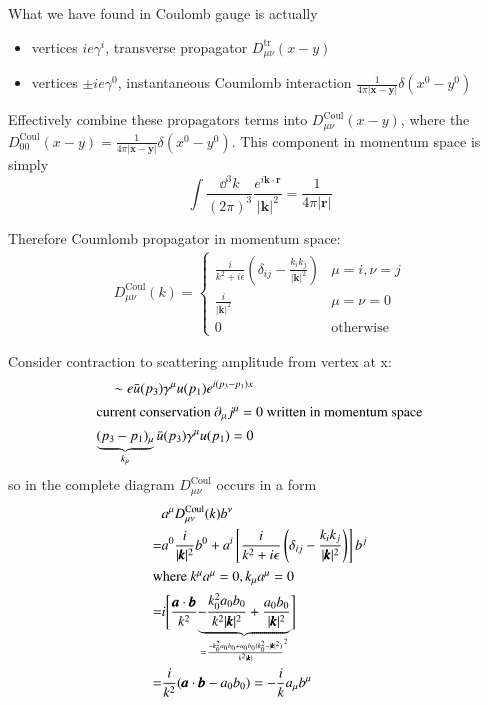 What we have found in Coulomb gauge is actually
\begin{itemize}
	\item %
		vertices $ie\gamma^i$, transverse propagator $D^\text{tr}_{\mu\nu}(x-y)$
	\item %
		vertices $\pm ie \gamma^0$, instantaneous Coumlomb interaction $\frac{1}{4\pi |\pmb{x}- \pmb{y}|}\delta(x^0 - y^0)$
\end{itemize}

Effectively combine these propagators terms into $D_{\mu\nu}^\text{Coul}(x-y)$, where the  $D_{00}^\text{Coul}(x-y) = \frac{1}{4\pi |\pmb{x}- \pmb{y}|}\delta(x^0 - y^0)$.  This component in momentum space is simply 
$$\int \frac{\dd^3 k}{(2\pi)^3} \frac{e^{i\pmb{k}\cdot \pmb{r}}}{|\pmb{k}|^2} = \frac{1}{4\pi|\pmb{r}|}$$

Therefore Coumlomb propagator in momentum space:
\begin{align*}
	D^\text{Coul}_{\mu\nu}(k) = 
	\begin{cases}
		\frac{i}{k^2 + i \epsilon} \left(\delta_{ij} - \frac{k_ik_j}{|\pmb{k}|^2} \right) & \mu = i, \nu=j \\
		\frac{i}{|\pmb{k}|^2} & \mu = \nu = 0\\
		0 & \text{otherwise}
	\end{cases}
\end{align*}

Consider contraction to scattering amplitude from vertex at x:
\begin{align*}
	\sim e \bar{u} (p_3) \gamma^\mu u(p_1) e^{i(p_3 - p_1)x} \\
	\shortintertext{current conservation $\partial_\mu j^\mu = 0$ written in momentum space}
	\underbrace{(p_3 - p_1)_\mu}_{k_\mu} \bar{u} (p_3) \gamma^\mu u(p_1) = 0
\end{align*}
so in the complete diagram $D^\text{Coul}_{\mu\nu}$ occurs in a form %
\begin{align*}
	& a^\mu D^\text{Coul}_{\mu\nu}(k) b^\nu \\
	=& a^0 \frac{i}{|\pmb{k}|^2}b^0 +  a^i \left[ \frac{i}{k^2 + i \epsilon} \left(\delta_{ij} - \frac{k_ik_j}{|\pmb{k}|^2} \right) \right]  b^j \\
	\shortintertext{where $k^\mu a^\mu = 0, k_\mu a^\mu =0$}
	=& i \Bigg[ \frac{\pmb{a}\cdot\pmb{b}}{k^2} {\underbrace{- \frac{k^2_0 a_0 b_0}{k^2 |\pmb{k}|^2} + \frac{a_0 b_0}{|\pmb{k}|^2} }_{=\frac{-k_0^2 a_0 b_0 + a_0 b_0 (k_0^2 - |\pmb{k}|^2)}{k^2|\pmb{k}|}^2}} \Bigg] \\
	=& \frac{i}{k^2}(\pmb{a}\cdot\pmb{b}-a_0b_0) = -\frac{i}{k} a_\mu b^\mu
\end{align*}

